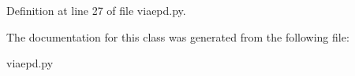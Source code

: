Definition at line 27 of file viaepd.\+py.



The documentation for this class was generated from the following file\+:\begin{DoxyCompactItemize}
\item 
viaepd.\+py\end{DoxyCompactItemize}
